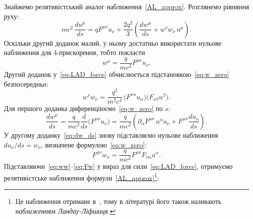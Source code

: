 Знайжемо релятивістський аналог наближення~\eqref{AL_approx}. Розглянемо рівняння руху:
\begin{equation}\label{eq:full_EOM}
	mc^2\,\frac{du^{\mu}}{ds} = qF^{\mu\nu}u_{\nu}
	+ \frac{2q^2}{3}\left(\frac{dw^{\mu}}{ds} + w^{\nu}w_{\nu}\,u^{\mu}\right).
\end{equation}
Оскільки другий доданок малий, у ньому достатньо використати нульове
наближення для 4-прискорення, тобто покласти
\begin{equation}\label{eq:w_zero}
	w^{\mu} = \frac{q}{mc^2}F^{\mu\nu}u_{\nu}.
\end{equation}
Другий доданок у~\eqref{eq:LAD_force} обчислюється підстановкою~\eqref{eq:w_zero}
безпосередньо:
\begin{equation}\label{eq:ww}
	w^{\nu}w_{\nu} = \frac{q^2}{m^2c^4}\,
	\bigl(F^{\nu\alpha}u_{\alpha}\bigr)\bigl(F_{\nu\beta}u^{\beta}\bigr).
\end{equation}
Для першого доданка диференціюємо~\eqref{eq:w_zero} по $s$:
\begin{equation}\label{eq:dw_ds}
	\frac{dw^{\mu}}{ds}
	= \frac{q}{mc^2}\frac{d}{ds}\bigl(F^{\mu\nu}u_{\nu}\bigr)
	= \frac{q}{mc^2}\left(
		\partial_{\alpha}F^{\mu\nu}\,u^{\alpha}u_{\nu}
		+ F^{\mu\nu}\frac{du_{\nu}}{ds}
	  \right).
\end{equation}
У другому доданку~\eqref{eq:dw_ds} знову підставляємо нульове наближення
$du_{\nu}/ds = w_{\nu}$, визначене формулою~\eqref{eq:w_zero}:
\begin{equation}\label{eq:Fw}
	F^{\mu\nu}w_{\nu}
	= \frac{q}{mc^2}F^{\mu\nu}F_{\nu\alpha}u^{\alpha}.
\end{equation}
Підставляючи~\eqref{eq:ww}--\eqref{eq:Fw} у вираз для сили~\eqref{eq:LAD_force},
отримуємо релятивістське наближення формули~\eqref{AL_approx}\footnote{Це наближення отримане в~\cite[§~76]{LandauLifshitz2003}, тому в літературі його також
називають \emph{наближенням Ландау-Ліфшиця}.}:
